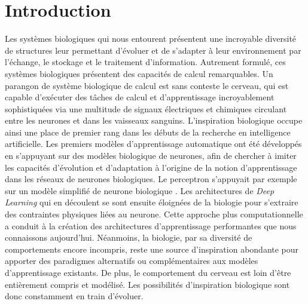 \chapter*{Introduction}

Les systèmes biologiques qui nous entourent présentent une incroyable diversité de structures leur permettant d'évoluer et de s'adapter à leur environnement par l'échange, le stockage et le traitement d'information.
Autrement formulé, ces systèmes biologiques présentent des capacités de calcul remarquables.
Un parangon de système biologique de calcul est sans conteste le cerveau, qui est capable d'exécuter des tâches de calcul et d'apprentissage incroyablement sophistiquées via une multitude de signaux électriques et chimiques circulant entre les neurones et dans les vaisseaux sanguins.
L'inspiration biologique occupe ainsi une place de premier rang dans les débuts de la recherche en intelligence artificielle. Les premiers modèles d'apprentissage automatique ont été développés en s'appuyant sur des modèles biologique de neurones, afin de chercher à imiter les capacités d'évolution et d'adaptation à l'origine de la notion d'apprentissage dans les réseaux de neurones biologiques.
Le perceptron s'appuyait par exemple sur un modèle simplifié de neurone biologique \parencite{McCulloch1990ALC}.
Les architectures de \emph{Deep Learning} qui en découlent se sont ensuite éloignées de la biologie pour s'extraire des contraintes physiques liées au neurone. Cette approche plus computationnelle a conduit à la création des architectures d'apprentissage performantes que nous connaissons aujourd'hui.
Néanmoins, la biologie, par sa diversité de comportements encore incompris, reste une source d'inspiration abondante pour apporter des paradigmes alternatifs ou complémentaires aux modèles d'apprentissage existants. De plus, le comportement du cerveau est loin d'être entièrement compris et modélisé. Les possibilités d'inspiration biologique sont donc constamment en train d'évoluer.

